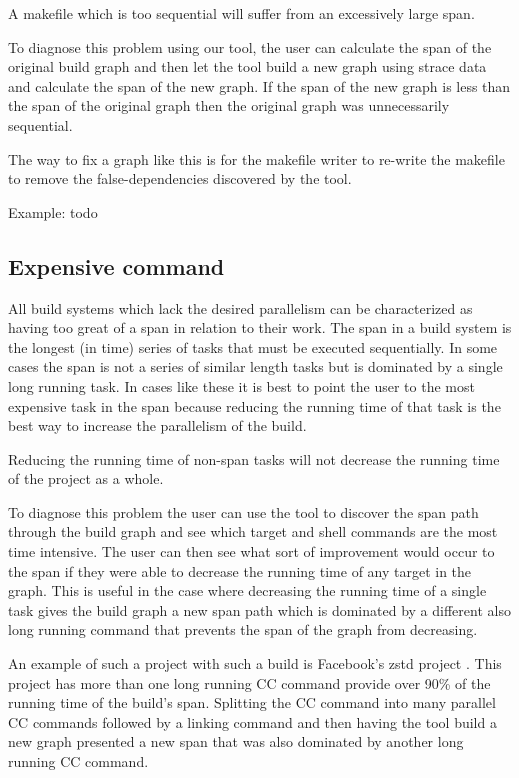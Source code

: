 \documentclass[twocolumn,acmtog,10pt,review]{acmart}
\begin{document}
A makefile which is too sequential will suffer from an excessively large span.

To diagnose this problem using our tool, the user can calculate the span of the original build
graph and then let the tool build a new graph using strace data and calculate the span of the
new graph.  If the span of the new graph is less than the span of the original graph then the
original graph was unnecessarily sequential.

The way to fix a graph like this is for the makefile writer to re-write the makefile to
remove the false-dependencies discovered by the tool.

Example: todo

\subsection{Expensive command}

All build systems which lack the desired parallelism can be characterized as having too great of
a span in relation to their work.  The span in a build system is the longest (in time) series of
tasks that must be executed sequentially.  In some cases the span is not a series of similar length
tasks but is dominated by a single long running task.  In cases like these it is best to point the
user to the most expensive task in the span because reducing the running time of that task is the
best way to increase the parallelism of the build.

Reducing the running time of non-span tasks will not decrease the running time of the project as
a whole.

To diagnose this problem the user can use the tool to discover the span path through the build
graph and see which target and shell commands are the most time intensive.  The user can then see
what sort of improvement would occur to the span if they were able to decrease the running
time of any target in the graph.  This is useful in the case where decreasing the running time
of a single task gives the build graph a new span path which is dominated by a different also
long running command that prevents the span of the graph from decreasing.

An example of such a project with such a build is Facebook's zstd project \cite{}.  This project
has more than one long running CC command provide over 90\% of the running time of the build's
span.  Splitting the CC command into many parallel CC commands followed by a linking command
and then having the tool build a new graph presented a new span that was also dominated by
another long running CC command.
\end{document}
